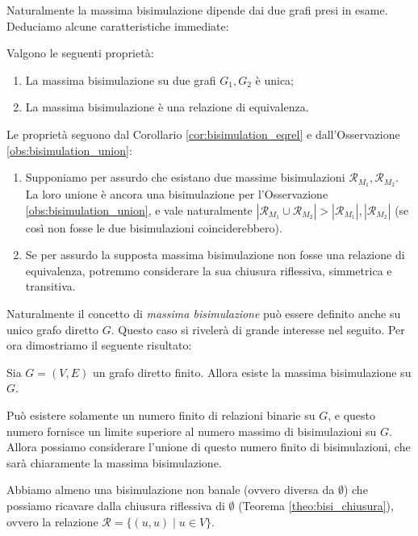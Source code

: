 Naturalmente la massima bisimulazione dipende dai due grafi presi in esame. Deduciamo alcune caratteristiche immediate:
\begin{proposition}
    Valgono le seguenti proprietà:
    \begin{enumerate}
        \item La massima bisimulazione su due grafi $G_1,G_2$ è unica;
        \item La massima bisimulazione è una relazione di equivalenza.
    \end{enumerate}
    \vspace*{-0.3cm}
    \label{prop:bisi_max_equi}
\end{proposition}
\begin{proof2}
    Le proprietà seguono dal Corollario \ref{cor:bisimulation_eqrel} e dall'Osservazione \ref{obs:bisimulation_union}:
    \begin{enumerate}
        \item Supponiamo per assurdo che esistano due massime bisimulazioni $\mathcal{R}_{M_1}, \mathcal{R}_{M_2}$. La loro unione è ancora una bisimulazione per l'Osservazione \ref{obs:bisimulation_union}, e vale naturalmente $|\mathcal{R}_{M_1} \cup \mathcal{R}_{M_2}| > |\mathcal{R}_{M_1}|, |\mathcal{R}_{M_2}|$ (se così non fosse le due bisimulazioni coinciderebbero).
        \item Se per assurdo la supposta massima bisimulazione non fosse una relazione di equivalenza, potremmo considerare la sua chiusura riflessiva, simmetrica e transitiva.
    \end{enumerate}
    \vspace*{-0.7cm}
\end{proof2}
Naturalmente il concetto di \emph{massima bisimulazione} può essere definito anche su unico grafo diretto $G$. Questo caso si rivelerà di grande interesse nel seguito. Per ora dimostriamo il seguente risultato:
\begin{theorem}
    Sia $G=(V,E)$ un grafo diretto finito. Allora esiste la massima bisimulazione su $G$.
\end{theorem}
\begin{proof2}
    Può esistere solamente un numero finito di relazioni binarie su $G$, e questo numero fornisce un limite superiore al numero massimo di bisimulazioni su $G$.
    Allora possiamo considerare l'unione di questo numero finito di bisimulazioni, che sarà chiaramente la massima bisimulazione.

    Abbiamo almeno una bisimulazione non banale (ovvero diversa da $\emptyset$) che possiamo ricavare dalla chiusura riflessiva di $\emptyset$ (Teorema \ref{theo:bisi_chiusura}), ovvero la relazione $\mathcal{R} = \{(u,u) \mid u \in V\}$.
\end{proof2}

